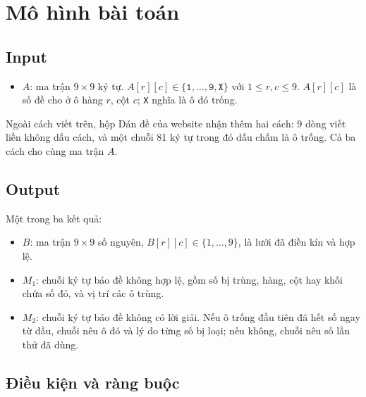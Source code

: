 \chapter{Mô hình bài toán}

\section{Input}

\begin{itemize}
  \item \(A\): ma trận \(9 \times 9\) ký tự. \(A[r][c] \in \{\texttt{1}, \ldots, \texttt{9}, \texttt{X}\}\) với \(1 \le r, c \le 9\). \(A[r][c]\) là số đề cho ở ô hàng \(r\), cột \(c\); \texttt{X} nghĩa là ô đó trống.
\end{itemize}

Ngoài cách viết trên, hộp Dán đề của website nhận thêm hai cách: 9 dòng viết liền không dấu cách, và một chuỗi 81 ký tự trong đó dấu chấm là ô trống. Cả ba cách cho cùng ma trận \(A\).

\section{Output}

Một trong ba kết quả:

\begin{itemize}
  \item \(B\): ma trận \(9 \times 9\) số nguyên, \(B[r][c] \in \{1, \ldots, 9\}\), là lưới đã điền kín và hợp lệ.
  \item \(M_1\): chuỗi ký tự báo đề không hợp lệ, gồm số bị trùng, hàng, cột hay khối chứa số đó, và vị trí các ô trùng.
  \item \(M_2\): chuỗi ký tự báo đề không có lời giải. Nếu ô trống đầu tiên đã hết số ngay từ đầu, chuỗi nêu ô đó và lý do từng số bị loại; nếu không, chuỗi nêu số lần thử đã dùng.
\end{itemize}

\section{Điều kiện và ràng buộc}

